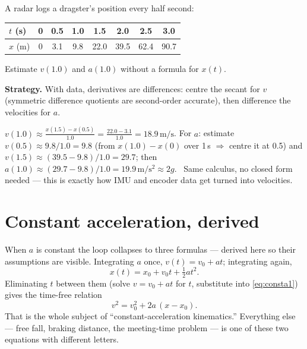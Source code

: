 \begin{example}\label{ex:dataderiv}
A radar logs a dragster's position every half second:
\begin{center}
\begin{tabular}{l|ccccccc}
$t$ (s) & 0 & 0.5 & 1.0 & 1.5 & 2.0 & 2.5 & 3.0\\\hline
$x$ (m) & 0 & 3.1 & 9.8 & 22.0 & 39.5 & 62.4 & 90.7
\end{tabular}
\end{center}
Estimate $v(1.0)$ and $a(1.0)$ without a formula for $x(t)$.
\par\smallskip
\textbf{Strategy.} With data, derivatives are differences: centre the secant
for $v$ (symmetric difference quotients are second-order accurate), then
difference the velocities for $a$.
\begin{solution}
$v(1.0)\approx\frac{x(1.5)-x(0.5)}{1.0}=\frac{22.0-3.1}{1.0}=
18.9\,\mathrm{m/s}$. For $a$: estimate $v(0.5)\approx9.8/1.0=9.8$ (from
$x(1.0)-x(0)$ over 1\,s $\Rightarrow$ centre it at 0.5) and
$v(1.5)\approx(39.5-9.8)/1.0=29.7$; then
$a(1.0)\approx(29.7-9.8)/1.0=19.9\,\mathrm{m/s^{2}}\approx2g$.
\checkmark\ Same calculus, no closed form needed --- this is exactly how IMU
and encoder data get turned into velocities.
\end{solution}
\end{example}

\section{Constant acceleration, derived}\label{sec:kin-consta}

When $a$ is constant the loop collapses to three formulas --- derived here so
their assumptions are visible. Integrating $a$ once,
$v(t)=v_0+at$; integrating again,
\begin{equation}
  x(t)=x_0+v_0 t+\tfrac12 at^{2}.\label{eq:consta1}
\end{equation}
Eliminating $t$ between them (solve $v=v_0+at$ for $t$, substitute into
\eqref{eq:consta1}) gives the time-free relation
\begin{equation}
  v^{2}=v_0^{2}+2a\,(x-x_0).\label{eq:consta2}
\end{equation}
That is the whole subject of ``constant-acceleration kinematics.'' Everything
else --- free fall, braking distance, the meeting-time problem --- is one of
these two equations with different letters.


